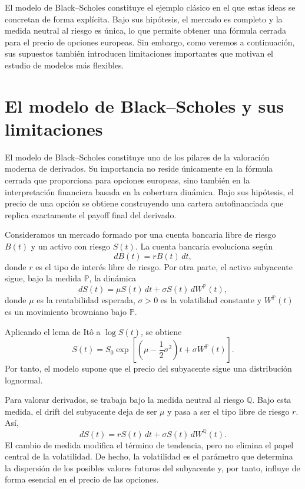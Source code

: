El modelo de Black--Scholes constituye el ejemplo clásico en el que estas ideas se concretan de forma explícita. Bajo sus hipótesis, el mercado es completo y la medida neutral al riesgo es única, lo que permite obtener una fórmula cerrada para el precio de opciones europeas. Sin embargo, como veremos a continuación, sus supuestos también introducen limitaciones importantes que motivan el estudio de modelos más flexibles.

\section{El modelo de Black--Scholes y sus limitaciones}

El modelo de Black--Scholes constituye uno de los pilares de la valoración moderna de derivados. Su importancia no reside únicamente en la fórmula cerrada que proporciona para opciones europeas, sino también en la interpretación financiera basada en la cobertura dinámica. Bajo sus hipótesis, el precio de una opción se obtiene construyendo una cartera autofinanciada que replica exactamente el payoff final del derivado.

Consideramos un mercado formado por una cuenta bancaria libre de riesgo \(B(t)\) y un activo con riesgo \(S(t)\). La cuenta bancaria evoluciona según
\[
dB(t)=rB(t)\,dt,
\]
donde \(r\) es el tipo de interés libre de riesgo. Por otra parte, el activo subyacente sigue, bajo la medida \(\mathbb{P}\), la dinámica
\[
dS(t)=\mu S(t)\,dt+\sigma S(t)\,dW^{\mathbb{P}}(t),
\]
donde \(\mu\) es la rentabilidad esperada, \(\sigma>0\) es la volatilidad constante y \(W^{\mathbb{P}}(t)\) es un movimiento browniano bajo \(\mathbb{P}\).

Aplicando el lema de Itô a \(\log S(t)\), se obtiene
\[
S(t)
=
S_0
\exp\left[
\left(\mu-\frac{1}{2}\sigma^2\right)t
+
\sigma W^{\mathbb{P}}(t)
\right].
\]
Por tanto, el modelo supone que el precio del subyacente sigue una distribución lognormal.

Para valorar derivados, se trabaja bajo la medida neutral al riesgo \(\mathbb{Q}\). Bajo esta medida, el drift del subyacente deja de ser \(\mu\) y pasa a ser el tipo libre de riesgo \(r\). Así,
\[
dS(t)=rS(t)\,dt+\sigma S(t)\,dW^{\mathbb{Q}}(t).
\]
El cambio de medida modifica el término de tendencia, pero no elimina el papel central de la volatilidad. De hecho, la volatilidad es el parámetro que determina la dispersión de los posibles valores futuros del subyacente y, por tanto, influye de forma esencial en el precio de las opciones.

